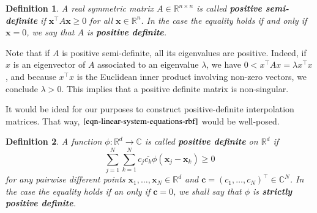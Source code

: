 \documentclass[12pt]{report} %
\newtheorem{definition}{Definition}
\newcommand{\tmmathbf}[1]{\ensuremath{\boldsymbol{#1}}}
\newcommand{\tmstrong}[1]{\textbf{#1}}
\begin{document}
\begin{definition}
  A real symmetric matrix $A \in \mathbb{R}^{n \times n}$ is called
    {\tmstrong{positive semi-definite}} if $\tmmathbf{x}^{\top} A\tmmathbf{x}
    \geq 0$ for all $\tmmathbf{x} \in \mathbb{R}^n$. In the case the equality
  holds if and only if $\tmmathbf{x}= 0$, we say that $A$ is
    {\tmstrong{positive definite}}.
\end{definition}

Note that if $A$ is positive semi-definite, all its eigenvalues are positive.
Indeed, if $x$ is an eigenvector of $A$ associated to an eigenvalue $\lambda$,
we have $0 < x^{\top} A x = \lambda x^{\top} x$, and because $x^{\top} x$ is
the Euclidean inner product involving non-zero vectors, we conclude $\lambda >
  0$. This implies that a positive definite matrix is non-singular.

It would be ideal for our purposes to construct positive-definite
interpolation matrices. That way, $\eqref{eqn-linear-system-equations-rbf}$ would
be well-posed.

\begin{definition}\label{def-positive-definite-functions}
  A function $\phi : \mathbb{R}^d \rightarrow \mathbb{C}$ is called
    {\tmstrong{positive definite}} on $\mathbb{R}^d$ if
  \begin{equation}
    \sum_{j = 1}^N \sum_{k = 1}^N c_j \overline{c_k} \phi (\tmmathbf{x}_j
    -\tmmathbf{x}_k) \geq 0 \label{positivedefinitefunctioncomplexdefinition}
  \end{equation}
  for any pairwise different points $\tmmathbf{x}_1, \ldots, \tmmathbf{x}_N
    \in \mathbb{R}^d$ and $\tmmathbf{c}= (c_1, \ldots, c_N)^{\top} \in
    \mathbb{C}^N$. In the case the equality holds if an only if $\tmmathbf{c}=
    0$, we shall say that $\phi$ is {\tmstrong{strictly positive definite}}.
\end{definition}
\end{document}
